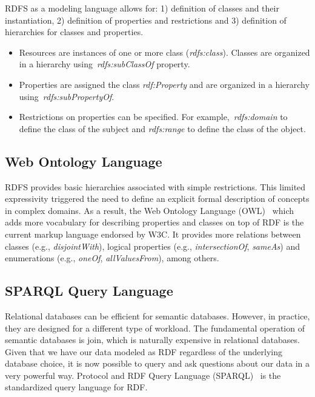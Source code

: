 RDFS as a modeling language allows for: 1) definition of classes and their instantiation, 2) definition of properties and restrictions and 3) definition of hierarchies for classes and properties.

\begin{itemize}
	\item Resources are instances of one or more class (\emph{rdfs:class}). Classes are organized in a hierarchy using~\emph{rdfs:subClassOf} property.
	\item Properties are assigned the class \emph{rdf:Property} and are organized in a hierarchy using~\emph{rdfs:subPropertyOf}.
	\item Restrictions on properties can be specified. For example,~\emph{rdfs:domain} to define the class of the subject and \emph{rdfs:range} to define the class of the object.
\end{itemize}

\subsection{Web Ontology Language}

RDFS provides basic hierarchies associated with simple restrictions. This limited expressivity triggered the need to define an explicit formal description of concepts in complex domains. As a result, the Web Ontology Language (OWL)~\cite{W3C:OWL:12} which adds more vocabulary for describing properties and classes on top of RDF is the current markup language endorsed by W3C. It provides more relations between classes (e.g., \emph{disjointWith}), logical properties (e.g., \emph{intersectionOf}, \emph{sameAs}) and enumerations (e.g., \emph{oneOf}, \emph{allValuesFrom}), among others.

\subsection{SPARQL Query Language}

Relational databases can be efficient for semantic databases. However, in practice, they are designed for a different type of workload. The fundamental operation of semantic databases is join, which is naturally expensive in relational databases. Given that we have our data modeled as RDF regardless of the underlying database choice, it is now possible to query and ask questions about our data in a very powerful way. Protocol and RDF Query Language (SPARQL)~\cite{Prud:SPARQL:08} is the standardized query language for RDF.

